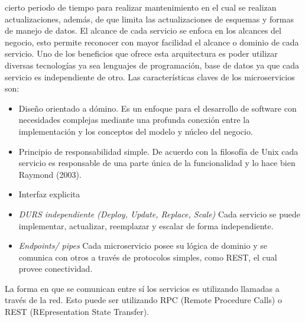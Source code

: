 \documentclass[12pt,twoside]{reedthesis}
\providecommand{\tightlist}{%
  \setlength{\itemsep}{0pt}\setlength{\parskip}{0pt}}
\theoremstyle{definition}
\theoremstyle{definition}
\theoremstyle{definition}
\theoremstyle{remark}
\begin{document}
cierto periodo de tiempo para realizar mantenimiento en el cual se
realizan actualizaciones, además, de que limita las actualizaciones de
esquemas y formas de manejo de datos. El alcance de cada servicio se
enfoca en los alcances del negocio, esto permite reconocer con mayor
facilidad el alcance o dominio de cada servicio. Uno de los beneficios
que ofrece esta arquitectura es poder utilizar diversas tecnologías ya
sea lenguajes de programación, base de datos ya que cada servicio es
independiente de otro. Las características claves de los microservicios
son:
\begin{itemize}
\tightlist
\item
  Diseño orientado a dómino. Es un enfoque para el desarrollo de
  software con necesidades complejas mediante una profunda conexión
  entre la implementación y los conceptos del modelo y núcleo del
  negocio.
\item
  Principio de responsabilidad simple. De acuerdo con la filosofía de
  Unix cada servicio es responsable de una parte única de la
  funcionalidad y lo hace bien Raymond (2003).
\item
  Interfaz explicita
\item
  \emph{DURS independiente (Deploy, Update, Replace, Scale)} Cada
  servicio se puede implementar, actualizar, reemplazar y escalar de
  forma independiente.
\item
  \emph{Endpoints/ pipes} Cada microservicio posee su lógica de dominio
  y se comunica con otros a través de protocolos simples, como REST, el
  cual provee conectividad.
\end{itemize}
La forma en que se comunican entre sí los servicios es utilizando
llamadas a través de la red. Esto puede ser utilizando RPC (Remote
Procedure Calls) o REST (REpresentation State Transfer).
\end{document}
